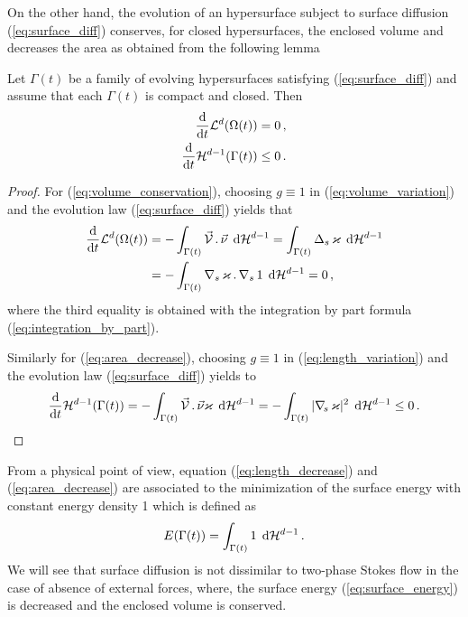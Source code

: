 On the other hand, the evolution of an hypersurface subject to surface
diffusion (\ref{eq:surface_diff}) conserves, for closed hypersurfaces, the
enclosed volume and decreases the area as obtained from the following
lemma

\begin{lemma}
Let $\Gamma(t)$ be a family of evolving hypersurfaces satisfying
(\ref{eq:surface_diff}) and assume that each $\Gamma(t)$ is
compact and closed. Then
\begin{align}
\frac{\rm d}{{\rm d}t} \mathcal{L}^d(\Omega(t)) & = 0 \,, \label{eq:volume_conservation} \\
\frac{\rm d}{{\rm d}t} \mathcal{H}^{d-1} (\Gamma(t)) & \leq 0 \,.\label{eq:area_decrease}
\end{align}
\end{lemma}

\begin{proof}
For (\ref{eq:volume_conservation}), choosing $g \equiv 1$ in
(\ref{eq:volume_variation}) and the evolution law (\ref{eq:surface_diff}) yields
that
\begin{align*}
\frac{\rm d}{{\rm d}t} \mathcal{L}^d(\Omega(t)) & = - \int_{\Gamma(t)} \vec{\mathcal{V}}\,.\,\vec\nu \,
\;{\rm d}{\cal H}^{d-1} = \int_{\Gamma(t)} \Delta_s \, \varkappa \, \;{\rm d}{\cal H}^{d-1} \nonumber \\
& = -\int_{\Gamma(t)} \nabla_s \, \varkappa \,.\, \nabla_s \, 1 \, \;{\rm d}{\cal H}^{d-1}=0\,,
\end{align*}
where the third equality is obtained with the integration by part formula
(\ref{eq:integration_by_part}).

Similarly for (\ref{eq:area_decrease}), choosing $g \equiv 1$ in
(\ref{eq:length_variation}) and the evolution law (\ref{eq:surface_diff}) yields
to
\begin{equation*}
\frac{\rm d}{{\rm d}t} \mathcal{H}^{d-1}(\Gamma(t)) = - \int_{\Gamma(t)} \vec{\mathcal{V}}\,.\,\vec\nu
\varkappa \, \;{\rm d}{\cal H}^{d-1} = - \int_{\Gamma(t)} |\nabla_{\!s} \, \varkappa|^2 \, \;{\rm d}{\cal H}^{d-1}
\leq 0 \,.
\end{equation*}
\end{proof}

From a physical point of view, equation (\ref{eq:length_decrease}) and
(\ref{eq:area_decrease}) are associated to the minimization of the surface
energy with constant energy density 1 which is defined as
\begin{equation}\label{eq:surface_energy}
E(\Gamma(t)) = \int_{\Gamma(t)} 1 \, \;{\rm d}{\cal H}^{d-1} \, .
\end{equation}
We will see that surface diffusion is not dissimilar to two-phase Stokes flow
in the case of absence of external forces, where, the surface energy
(\ref{eq:surface_energy}) is decreased and the enclosed volume is conserved.

